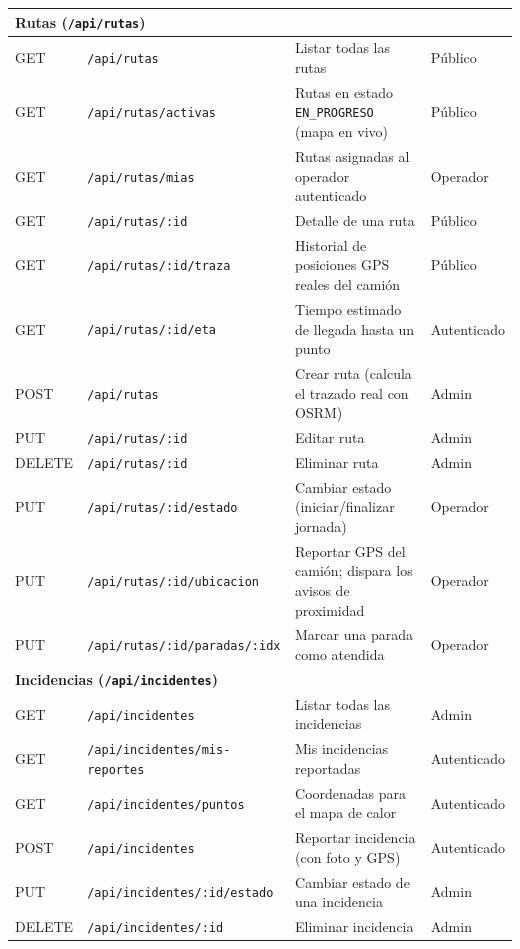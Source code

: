 \documentclass[11pt,a4paper]{article}
\begin{document}
\begin{longtable}{|p{1.6cm}|p{4.6cm}|p{6cm}|p{1.8cm}|}
\multicolumn{4}{|l|}{\cellcolor{grisclaro}\textbf{Rutas (\texttt{/api/rutas})}} \\
\hline
GET & \texttt{/api/rutas} & Listar todas las rutas & Público \\
\hline
GET & \texttt{/api/rutas/activas} & Rutas en estado \texttt{EN\_PROGRESO} (mapa en vivo) & Público \\
\hline
GET & \texttt{/api/rutas/mias} & Rutas asignadas al operador autenticado & Operador \\
\hline
GET & \texttt{/api/rutas/:id} & Detalle de una ruta & Público \\
\hline
GET & \texttt{/api/rutas/:id/traza} & Historial de posiciones GPS reales del camión & Público \\
\hline
GET & \texttt{/api/rutas/:id/eta} & Tiempo estimado de llegada hasta un punto & Autenticado \\
\hline
POST & \texttt{/api/rutas} & Crear ruta (calcula el trazado real con OSRM) & Admin \\
\hline
PUT & \texttt{/api/rutas/:id} & Editar ruta & Admin \\
\hline
DELETE & \texttt{/api/rutas/:id} & Eliminar ruta & Admin \\
\hline
PUT & \texttt{/api/rutas/:id/estado} & Cambiar estado (iniciar/finalizar jornada) & Operador \\
\hline
PUT & \texttt{/api/rutas/:id/ubicacion} & Reportar GPS del camión; dispara los avisos de proximidad & Operador \\
\hline
PUT & \texttt{/api/rutas/:id/paradas/:idx} & Marcar una parada como atendida & Operador \\
\hline

\multicolumn{4}{|l|}{\cellcolor{grisclaro}\textbf{Incidencias (\texttt{/api/incidentes})}} \\
\hline
GET & \texttt{/api/incidentes} & Listar todas las incidencias & Admin \\
\hline
GET & \texttt{/api/incidentes/mis-reportes} & Mis incidencias reportadas & Autenticado \\
\hline
GET & \texttt{/api/incidentes/puntos} & Coordenadas para el mapa de calor & Autenticado \\
\hline
POST & \texttt{/api/incidentes} & Reportar incidencia (con foto y GPS) & Autenticado \\
\hline
PUT & \texttt{/api/incidentes/:id/estado} & Cambiar estado de una incidencia & Admin \\
\hline
DELETE & \texttt{/api/incidentes/:id} & Eliminar incidencia & Admin \\
\hline


\end{longtable}
\end{document}
